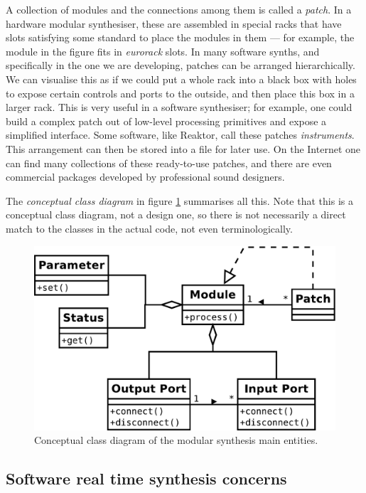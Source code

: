 A collection of modules and the connections among them is called a
\emph{patch}. In a hardware modular synthesiser, these are assembled
in special racks that have slots satisfying some standard to place the
modules in them --- for example, the module in the figure fits in
\emph{eurorack} slots. In many software synths, and specifically in
the one we are developing, patches can be arranged hierarchically. We
can visualise this as if we could put a whole rack into a black box
with holes to expose certain controls and ports to the outside, and
then place this box in a larger rack. This is very useful in a
software synthesiser; for example, one could build a complex patch out
of low-level processing primitives and expose a simplified
interface. Some software, like Reaktor, call these patches
\emph{instruments}. This arrangement can then be stored into a file
for later use. On the Internet one can find many collections of these
ready-to-use patches, and there are even commercial packages developed
by professional sound designers.

The \emph{conceptual class diagram} in figure \ref{fig:graphconcept}
summarises all this. Note that this is a conceptual class diagram, not
a design one, so there is not necessarily a direct match to the
classes in the actual code, not even terminologically.

\begin{figure}[h]
  \centering
  \includegraphics[width=.8\textwidth]{pic/graph-concept.pdf}
  \caption{Conceptual class diagram of the modular synthesis main
    entities.}
  \label{fig:graphconcept}
\end{figure}

\subsection{Software real time synthesis concerns}
\label{sec:rtsynth}

